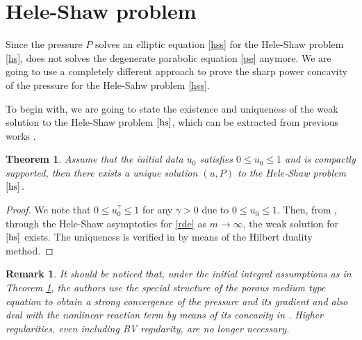 \documentclass[10pt]{article}         %
\newtheorem{theorem}{Theorem}[section]
\newtheorem{remark}{Remark}[section]
\numberwithin{equation}{section}
\begin{document}
\section{Hele-Shaw problem}\label{hsp}
Since the pressure $P$ solves an elliptic equation \eqref{hss} for the Hele-Shaw problem \eqref{hs}, does not solves  the degenerate parabolic equation \eqref{pe} anymore. We are going to  use a completely different approach to prove the sharp power concavity of the pressure for the Hele-Sahw problem \eqref{hss}.


To begin with, we are going to state the existence and uniqueness of the weak solution to the Hele-Shaw problem $\eqref{hs}$, which can be extracted from previous works \cite{DN2023,PERTHAME2014}.
\begin{theorem}\label{eu}
    Assume that the initial data $u_0$ satisfies $0\leq u_0\leq 1$ and is compactly supported, then there exists a unique solution $(u,P)$ to the Hele-Shaw problem $\eqref{hs}$.
\end{theorem}
\begin{proof}
We note that $0\leq u_0^{\gamma}\leq 1$ for any $\gamma>0$ due to $0\leq u_0\leq 1$. Then, from \cite{DN2023}, through the Hele-Shaw asymptotics for \eqref{rde} as $m\to\infty$, the weak solution for $\eqref{hs}$ exists. The uniqueness is verified in \cite{PERTHAME2014} by means of the Hilbert duality method.
\end{proof}
\begin{remark}
 It should be noticed that, under the initial integral assumptions as in Theorem \ref{eu}, the authors use the special structure of the porous medium type equation to obtain a strong convergence of the pressure and its gradient and also deal with the nonlinear reaction term by means of its concavity in \cite{DN2023}. Higher regularities, even including BV regularity, are no longer necessary.
\end{remark}
\end{document}
